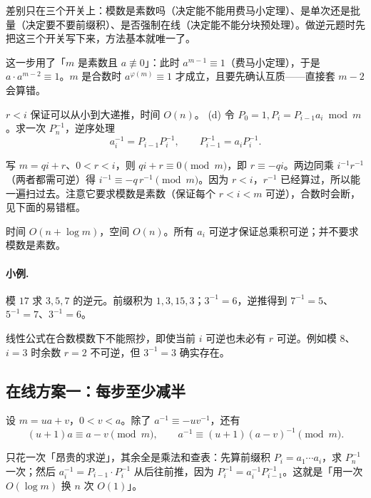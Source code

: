 \documentclass[UTF8,a4paper,11pt,oneside,openany,fontset=fandol]{ctexbook}
\theoremstyle{definition}
\begin{document}
\begin{tip}[为什么要分五类]
差别只在三个开关上：模数是素数吗（决定能不能用费马小定理）、是单次还是批量（决定要不要前缀积）、是否强制在线（决定能不能分块预处理）。做逆元题时先把这三个开关写下来，方法基本就唯一了。
\end{tip}

\begin{tip}
这一步用了「$m$ 是素数且 $a\not\equiv0$」：此时 $a^{m-1}\equiv1$（费马小定理），于是 $a\cdot a^{m-2}\equiv1$。$m$ 是合数时 $a^{\varphi(m)}\equiv1$ 才成立，且要先确认互质——直接套 $m-2$ 会算错。
\end{tip}

$r<i$ 保证可以从小到大递推，时间 $O(n)$。
(d) 令 $P_0=1,P_i=P_{i-1}a_i\bmod m$。求一次 $P_n^{-1}$，逆序处理
\[
 a_i^{-1}=P_{i-1}P_i^{-1},\qquad P_{i-1}^{-1}=a_iP_i^{-1}.
\]

\begin{tip}[线性递推逆元公式是怎么来的]
写 $m=qi+r$、$0<r<i$，则 $qi+r\equiv0\pmod m$，即 $r\equiv-qi$。两边同乘 $i^{-1}r^{-1}$（两者都需可逆）得 $i^{-1}\equiv-q\,r^{-1}\pmod m$。因为 $r<i$，$r^{-1}$ 已经算过，所以能一遍扫过去。注意它要求模数是素数（保证每个 $r<i<m$ 可逆），合数时会断，见下面的易错框。
\end{tip}

时间 $O(n+\log m)$，空间 $O(n)$。所有 $a_i$ 可逆才保证总乘积可逆；并不要求模数是素数。

\paragraph{小例.} 模 $17$ 求 $3,5,7$ 的逆元。前缀积为 $1,3,15,3$；$3^{-1}=6$，逆推得到 $7^{-1}=5$、$5^{-1}=7$、$3^{-1}=6$。

\begin{pitfall}
线性公式在合数模数下不能照抄，即使当前 $i$ 可逆也未必有 $r$ 可逆。例如模 $8$、$i=3$ 时余数 $r=2$ 不可逆，但 $3^{-1}=3$ 确实存在。
\end{pitfall}

\subsection{在线方案一：每步至少减半}
设 $m=ua+v$，$0<v<a$。除了 $a^{-1}\equiv-u v^{-1}$，还有
\[
 (u+1)a\equiv a-v\pmod m,
 \qquad a^{-1}\equiv(u+1)(a-v)^{-1}\pmod m.
\]

\begin{tip}[前缀积批量求逆元的想法]
只花一次「昂贵的求逆」，其余全是乘法和查表：先算前缀积 $P_i=a_1\cdots a_i$，求 $P_n^{-1}$ 一次；然后 $a_i^{-1}=P_{i-1}\cdot P_i^{-1}$ 从后往前推，因为 $P_i^{-1}=a_i^{-1}P_{i-1}^{-1}$。这就是「用一次 $O(\log m)$ 换 $n$ 次 $O(1)$」。
\end{tip}
\end{document}
